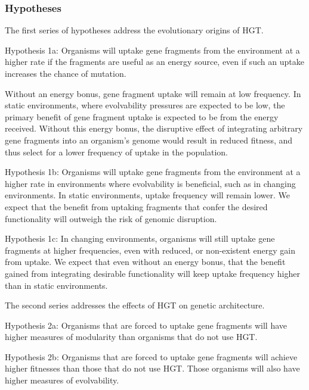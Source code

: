 \subsubsection{Hypotheses}

The first series of hypotheses address the evolutionary origins of HGT.

Hypothesis 1a: Organisms will uptake gene fragments from the environment at a higher rate if the fragments are useful as an energy source, even if such an uptake increases the chance of mutation. 

Without an energy bonus, gene fragment uptake will remain at low frequency. In static environments, where evolvability pressures are expected to be low, the primary benefit of gene fragment uptake is expected to be from the energy received. Without this energy bonus, the disruptive effect of integrating arbitrary gene fragments into an organism’s genome would result in reduced fitness, and thus select for a lower frequency of uptake in the population.

Hypothesis 1b: Organisms will uptake gene fragments from the environment at a higher rate in environments where evolvability is beneficial, such as in changing environments. In static environments, uptake frequency will remain lower. We expect that the benefit from uptaking fragments that confer the desired functionality will outweigh the risk of genomic disruption.

Hypothesis 1c: In changing environments, organisms will still uptake gene fragments at higher frequencies, even with reduced, or non-existent energy gain from uptake. We expect that even without an energy bonus, that the benefit gained from integrating desirable functionality will keep uptake frequency higher than in static environments.

The second series addresses the effects of HGT on genetic architecture.

Hypothesis 2a: Organisms that are forced to uptake gene fragments will have higher measures of modularity than organisms that do not use HGT.

Hypothesis 2b: Organisms that are forced to uptake gene fragments will achieve higher fitnesses than those that do not use HGT. Those organisms will also have higher measures of evolvability.